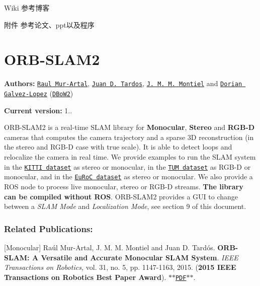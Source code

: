 
\begin{DoxyItemize}
\item Wiki 参考博客
\item 附件 参考论文、ppt以及程序
\end{DoxyItemize}

\section*{O\-R\-B-\/\-S\-L\-A\-M2}

{\bfseries Authors\-:} \href{http://webdiis.unizar.es/~raulmur/}{\tt Raul Mur-\/\-Artal}, \href{http://webdiis.unizar.es/~jdtardos/}{\tt Juan D. Tardos}, \href{http://webdiis.unizar.es/~josemari/}{\tt J. M. M. Montiel} and \href{http://doriangalvez.com/}{\tt Dorian Galvez-\/\-Lopez} (\href{https://github.com/dorian3d/DBoW2}{\tt D\-Bo\-W2})

{\bfseries Current version\-:} 1..

O\-R\-B-\/\-S\-L\-A\-M2 is a real-\/time S\-L\-A\-M library for {\bfseries Monocular}, {\bfseries Stereo} and {\bfseries R\-G\-B-\/\-D} cameras that computes the camera trajectory and a sparse 3\-D reconstruction (in the stereo and R\-G\-B-\/\-D case with true scale). It is able to detect loops and relocalize the camera in real time. We provide examples to run the S\-L\-A\-M system in the \href{http://www.cvlibs.net/datasets/kitti/eval_odometry.php}{\tt K\-I\-T\-T\-I dataset} as stereo or monocular, in the \href{http://vision.in.tum.de/data/datasets/rgbd-dataset}{\tt T\-U\-M dataset} as R\-G\-B-\/\-D or monocular, and in the \href{http://projects.asl.ethz.ch/datasets/doku.php?id=kmavvisualinertialdatasets}{\tt Eu\-Ro\-C dataset} as stereo or monocular. We also provide a R\-O\-S node to process live monocular, stereo or R\-G\-B-\/\-D streams. {\bfseries The library can be compiled without R\-O\-S}. O\-R\-B-\/\-S\-L\-A\-M2 provides a G\-U\-I to change between a {\itshape S\-L\-A\-M Mode} and {\itshape Localization Mode}, see section 9 of this document.

\href{https://www.youtube.com/embed/ufvPS5wJAx0}{\tt }

\subsubsection*{Related Publications\-:}

\mbox{[}Monocular\mbox{]} Raúl Mur-\/\-Artal, J. M. M. Montiel and Juan D. Tardós. {\bfseries O\-R\-B-\/\-S\-L\-A\-M\-: A Versatile and Accurate Monocular S\-L\-A\-M System}. {\itshape I\-E\-E\-E Transactions on Robotics,} vol. 31, no. 5, pp. 1147-\/1163, 2015. ({\bfseries 2015 I\-E\-E\-E Transactions on Robotics Best Paper Award}). $\ast$$\ast$\href{http://webdiis.unizar.es/~raulmur/MurMontielTardosTRO15.pdf}{\tt P\-D\-F}$\ast$$\ast$.

